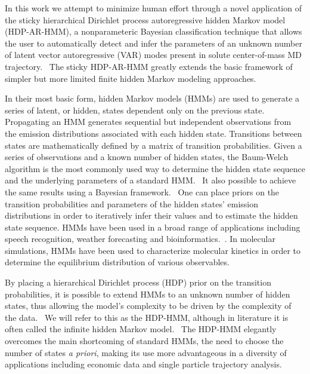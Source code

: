 \documentclass[journal=jpcbfk,manuscript=article]{achemso}
\begin{document}
  In this work we attempt to minimize human effort through a novel application of 
  the sticky hierarchical Dirichlet process autoregressive hidden Markov model 
  (HDP-AR-HMM), a nonparameteric Bayesian classification technique that allows the user to 
  automatically detect and infer the parameters of an unknown number of latent vector
  autoregressive (VAR) modes present in solute center-of-mass MD 
  trajectory.~\cite{fox_bayesian_2010} The sticky HDP-AR-HMM greatly extends the 
  basic framework of simpler but more limited finite hidden Markov modeling approaches.
    
  In their most basic form, hidden Markov models (HMMs) are used to generate
  a series of latent, or hidden, states dependent only on the previous state.~\cite{rabiner_tutorial_1989}
  Propagating an HMM generates sequential but independent observations from 
  the emission distributions associated with each hidden state. Transitions 
  between states are mathematically defined by a matrix of transition probabilities.
  Given a series of observations and a known number of hidden states, the 
  Baum-Welch algorithm is the most commonly used way to determine the hidden
  state sequence and the underlying parameters of a standard HMM.~\cite{baum_maximization_1970}
  It also possible to achieve the same results using a Bayesian 
  framework.~\cite{scott_bayesian_2002,jasra_markov_2005} One can place priors
  on the transition probabilities and parameters of the hidden states' emission
  distributions in order to iteratively infer their values and to estimate the hidden state
  sequence. HMMs have been used in a broad range of applications including speech
  recognition, weather forecasting and bioinformatics.~\cite{juang_hidden_1984,hughes_non-homogeneous_1999,yoon_hidden_2009}. In molecular simulations, HMMs have been
  used to characterize molecular kinetics in order to determine the equilibrium 
  distribution of various observables.~\cite{noe_probability_2008}
  
  By placing a hierarchical Dirichlet process (HDP) prior on the transition 
  probabilities, it is possible to extend HMMs to an unknown number of hidden
  states, thus allowing the model's complexity to be driven by the complexity
  of the data.~\cite{teh_hierarchical_2006} We will refer to this as the HDP-HMM,
  although in literature it is often called the infinite hidden Markov 
  model.~\cite{beal_infinite_2002} The HDP-HMM elegantly overcomes the main
  shortcoming of standard HMMs, the need to choose the number of states 
  \textit{a priori}, making its use more advantageous in a diversity of 
  applications including economic data and single particle trajectory 
  analysis.~\cite{shi_identifying_2016,hines_analyzing_2015} 
\end{document}
